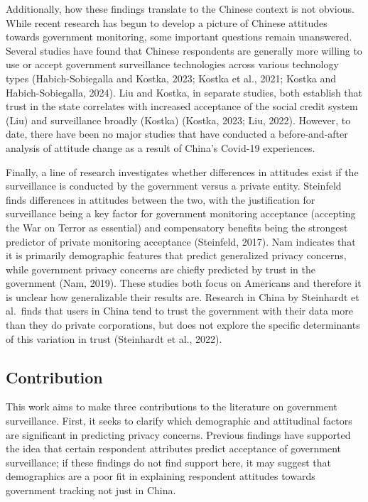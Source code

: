 \documentclass[
  letterpaper,
  DIV=11,
  numbers=noendperiod]{scrartcl}
\begin{document}
Additionally, how these findings translate to the Chinese context is not
obvious. While recent research has begun to develop a picture of Chinese
attitudes towards government monitoring, some important questions remain
unanswered. Several studies have found that Chinese respondents are
generally more willing to use or accept government surveillance
technologies across various technology types (Habich-Sobiegalla and
Kostka, 2023; Kostka et al., 2021; Kostka and Habich-Sobiegalla, 2024).
Liu and Kostka, in separate studies, both establish that trust in the
state correlates with increased acceptance of the social credit system
(Liu) and surveillance broadly (Kostka) (Kostka, 2023; Liu, 2022).
However, to date, there have been no major studies that have conducted a
before-and-after analysis of attitude change as a result of China's
Covid-19 experiences.

Finally, a line of research investigates whether differences in
attitudes exist if the surveillance is conducted by the government
versus a private entity. Steinfeld finds differences in attitudes
between the two, with the justification for surveillance being a key
factor for government monitoring acceptance (accepting the War on Terror
as essential) and compensatory benefits being the strongest predictor of
private monitoring acceptance (Steinfeld, 2017). Nam indicates that it
is primarily demographic features that predict generalized privacy
concerns, while government privacy concerns are chiefly predicted by
trust in the government (Nam, 2019). These studies both focus on
Americans and therefore it is unclear how generalizable their results
are. Research in China by Steinhardt et al.~finds that users in China
tend to trust the government with their data more than they do private
corporations, but does not explore the specific determinants of this
variation in trust (Steinhardt et al., 2022).

\subsection{Contribution}\label{contribution}

This work aims to make three contributions to the literature on
government surveillance. First, it seeks to clarify which demographic
and attitudinal factors are significant in predicting privacy concerns.
Previous findings have supported the idea that certain respondent
attributes predict acceptance of government surveillance; if these
findings do not find support here, it may suggest that demographics are
a poor fit in explaining respondent attitudes towards government
tracking not just in China.
\end{document}
